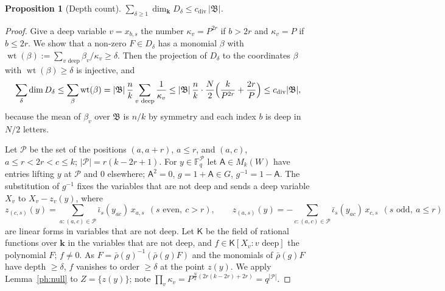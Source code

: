 \documentclass[10pt]{amsart}
\newtheorem{proposition}[theorem]{Proposition}
\theoremstyle{definition}
\theoremstyle{remark}
\providecommand{\auF}{\mathbb F}
\providecommand{\phB}{\mathfrak B}
\providecommand{\phcd}{c_{\mathrm{div}}}
\providecommand{\phk}{\boldsymbol k}
\begin{document}
\begin{proposition}[Depth count]\label{ph:depth}
$\displaystyle\sum_{\delta\ge1}\dim_{\phk} D_\delta\le\phcd\,|\phB|$.
\end{proposition}
\begin{proof}
Give a deep variable $v=x_{b,s}$ the number $\kappa_v=P^{2r}$ if $b>2r$ and $\kappa_v=P$ if
$b\le2r$. We show that a non-zero $F\in D_\delta$ has a monomial $\beta$ with
$\operatorname{wt}(\beta):=\sum_{v\text{ deep}}\beta_v/\kappa_v\ge\delta$. Then the projection of
$D_\delta$ to the coordinates $\beta$ with $\operatorname{wt}(\beta)\ge\delta$ is injective, and
\[
\sum_\delta\dim D_\delta\le\sum_\beta\operatorname{wt}(\beta)=|\phB|\,\frac nk\sum_{v\text{ deep}}
\frac1{\kappa_v}\le|\phB|\,\frac nk\cdot\frac N2\Bigl(\frac{k}{P^{2r}}+\frac{2r}P\Bigr)\le\phcd
|\phB|,
\]
because the mean of $\beta_v$ over $\phB$ is $n/k$ by symmetry and each index $b$ is deep in $N/2$
letters.

Let $\mathcal P$ be the set of the positions $(a,a+r)$, $a\le r$, and $(a,c)$, $a\le r<2r<c\le k$;
$|\mathcal P|=r(k-2r+1)$. For $y\in\auF_q^{\mathcal P}$ let $\mathsf A\in M_k(W)$ have entries
lifting $y$ at $\mathcal P$ and $0$ elsewhere; $\mathsf A^2=0$, $g=1+\mathsf A\in G$,
$g^{-1}=1-\mathsf A$. The substitution of $g^{-1}$ fixes the variables that are not deep and sends
a deep variable $X_v$ to $X_v-z_v(y)$, where
\[
z_{(c,s)}(y)=\sum_{a:(a,c)\in\mathcal P}\bar\iota_s(y_{ac})\,x_{a,s}\ \ (s\text{ even},\ c>r),\qquad
z_{(a,s)}(y)=-\sum_{c:(a,c)\in\mathcal P}\bar\iota_s(y_{ac})\,x_{c,s}\ \ (s\text{ odd},\ a\le r)
\]
are linear forms in variables that are not deep. Let $\mathsf K$ be the field of rational
functions over $\phk$ in the variables that are not deep, and $f\in\mathsf K[X_v:v\text{ deep}]$
the polynomial $F$; $f\ne0$. As $F=\bar\rho(g)^{-1}(\bar\rho(g)F)$ and the monomials of
$\bar\rho(g)F$ have depth $\ge\delta$, $f$ vanishes to order $\ge\delta$ at the point $z(y)$. We
apply Lemma~\ref{ph:null} to $Z=\{z(y)\}$; note $\prod_v\kappa_v=P^{\frac N2(2r(k-2r)+2r)}
=q^{|\mathcal P|}$.


\end{proof}
\end{document}
